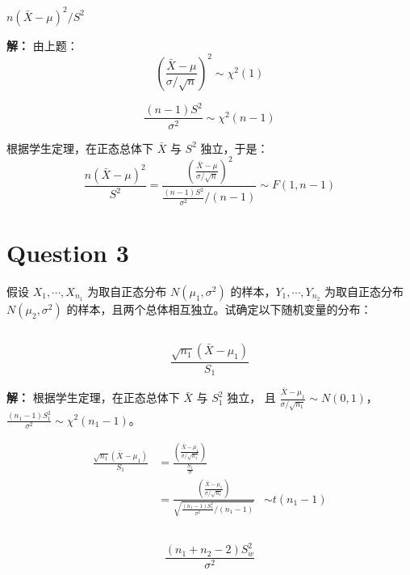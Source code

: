 \documentclass[12pt,a4paper]{article}
\begin{document}
\subsection{}
$n(\bar{X}-\mu)^2/S^2$
\begin{answerbox}
\textbf{解：}
  由上题：
  $$
  \left(\frac{\bar{X}-\mu}{\sigma/\sqrt{n}}\right)^2  \sim \chi^2(1)
  $$

  $$
  \frac{(n-1)S^2}{\sigma^2} \sim \chi^2(n-1)
  $$

  根据学生定理，在正态总体下 $\bar{X}$ 与 $S^2$ 独立，于是：
  $$
  \frac{n(\bar{X}-\mu)^2}{S^2} = \frac{\left(\frac{\bar{X}-\mu}{\sigma/\sqrt{n}}\right)^2}{\frac{(n-1)S^2}{\sigma^2}/(n-1)} \sim F(1, n-1)
  $$

\end{answerbox}

\section{Question 3}

假设 $X_1,\cdots,X_{n_1}$ 为取自正态分布 $N(\mu_1,\sigma^2)$ 的样本，$Y_1,\cdots,Y_{n_2}$ 为取自正态分布 $N(\mu_2,\sigma^2)$ 的样本，且两个总体相互独立。试确定以下随机变量的分布：

\subsection{}
    \[
        \frac{\sqrt{n_1}(\bar{X}-\mu_1)}{S_1}
    \]

\begin{answerbox}
  \textbf{解：}
  根据学生定理，在正态总体下 $\bar{X}$ 与 $S_1^2$ 独立，
  且 $\frac{\bar{X}-\mu_1}{\sigma/\sqrt{n_1}} \sim N(0,1)$，$\frac{(n_1-1)S_1^2}{\sigma^2} \sim \chi^2(n_1-1)$。

  $$
  \begin{aligned}
    \frac{\sqrt{n_1}(\bar{X}-\mu_1)}{S_1} &= \frac{\left(\frac{\bar{X}-\mu_1}{\sigma/\sqrt{n_1}}\right)}{\frac{S_1}{\sigma}} \\
    &= \frac{\left(\frac{\bar{X}-\mu_1}{\sigma/\sqrt{n_1}}\right)}{\sqrt{\frac{(n_1-1)S_1^2}{\sigma^2}/(n_1-1)}}
    &\sim t(n_1-1)
  \end{aligned}
  $$
\end{answerbox}

\subsection{}
    \[
        \frac{(n_1+n_2-2)S_w^2}{\sigma^2}
    \]
\end{document}
